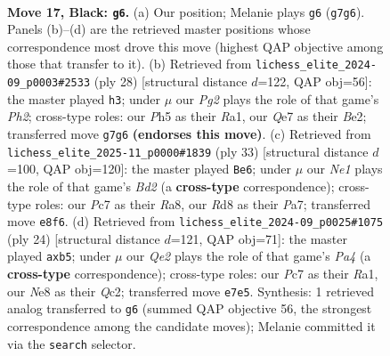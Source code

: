 \documentclass[11pt]{article}
\begin{document}
\begin{figure}[p]\centering
\begin{subfigure}{0.46\textwidth}\centering
\resizebox{\linewidth}{!}{%
\newchessgame
\chessboard[
  setfen={1rbrn1k1/p1p1qpp1/2n5/2PpP2p/1p6/1Q2PNP1/PP1B1P1P/2K1RBR1 b - - 2 17},
  showmover=false,
  pgfstyle=straightmove, color=movearrow, markmove={g7-g6}
]}
\caption{}
\end{subfigure}\hfill
\begin{subfigure}{0.46\textwidth}\centering
\resizebox{\linewidth}{!}{%
\newchessgame
\chessboard[
  setfen={r3kbr1/1b1q1p2/p1p1pn2/1p4pp/2pPP3/2N3B1/PP2BPPP/R1QR2K1 w q - 0 15},
  showmover=false,
  pgfstyle=straightmove, color=movearrow, markmove={h2-h3}
]}
\caption{}
\end{subfigure}
\\[4pt]
\begin{subfigure}{0.46\textwidth}\centering
\resizebox{\linewidth}{!}{%
\newchessgame
\chessboard[
  setfen={r5k1/pp1b1rpp/1nn5/q2pPp2/P1pP1P2/R1P5/2P1N1BP/2BQ1RK1 b - - 1 17},
  showmover=false,
  pgfstyle=straightmove, color=movearrow, markmove={d7-e6}
]}
\caption{}
\end{subfigure}\hfill
\begin{subfigure}{0.46\textwidth}\centering
\resizebox{\linewidth}{!}{%
\newchessgame
\chessboard[
  setfen={1rbq1rk1/2p2pp1/p1n1pb1p/1p6/P1pP4/2N2NP1/1PQ1PPBP/R2R2K1 w - - 0 13},
  showmover=false,
  pgfstyle=straightmove, color=movearrow, markmove={a4-b5}
]}
\caption{}
\end{subfigure}
\caption{\textbf{Move 17, Black: \texttt{g6}.} (a) Our position; Melanie plays \texttt{g6} (\texttt{g7g6}). Panels (b)--(d) are the retrieved master positions whose correspondence most drove this move (highest QAP objective among those that transfer to it). (b) Retrieved from \texttt{lichess\_elite\_2024-09\_p0003\#2533} (ply 28) [structural distance $d$=122, QAP obj=56]: the master played \texttt{h3}; under $\mu$ our \emph{Pg2} plays the role of that game's \emph{Ph2}; cross-type roles: our \emph{P}h5 as their \emph{R}a1, our \emph{Q}e7 as their \emph{B}e2; transferred move \texttt{g7g6} \textbf{(endorses this move)}. (c) Retrieved from \texttt{lichess\_elite\_2025-11\_p0000\#1839} (ply 33) [structural distance $d$=100, QAP obj=120]: the master played \texttt{Be6}; under $\mu$ our \emph{Ne1} plays the role of that game's \emph{Bd2} (a \textbf{cross-type} correspondence); cross-type roles: our \emph{P}c7 as their \emph{R}a8, our \emph{R}d8 as their \emph{P}a7; transferred move \texttt{e8f6}. (d) Retrieved from \texttt{lichess\_elite\_2024-09\_p0025\#1075} (ply 24) [structural distance $d$=121, QAP obj=71]: the master played \texttt{axb5}; under $\mu$ our \emph{Qe2} plays the role of that game's \emph{Pa4} (a \textbf{cross-type} correspondence); cross-type roles: our \emph{P}c7 as their \emph{R}a1, our \emph{N}e8 as their \emph{Q}c2; transferred move \texttt{e7e5}. Synthesis: 1 retrieved analog transferred to \texttt{g6} (summed QAP objective 56, the strongest correspondence among the candidate moves); Melanie committed it via the \texttt{search} selector.}
\label{fig:thought-m33}
\end{figure}
\end{document}
